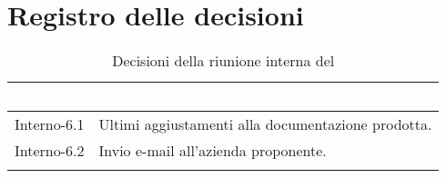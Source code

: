 \section{Registro delle decisioni}
{
\renewcommand{\arraystretch}{1.5}
\centering
\begin{longtable}{C{3cm} C{9cm}}
\textcolor{white}{\textbf{Codice}}&
\textcolor{white}{\textbf{Decisione}}\\	

\endhead
		
Interno-6.1 & Ultimi aggiustamenti alla documentazione prodotta.\\
Interno-6.2 & Invio e-mail all'azienda proponente.\\
\caption{Decisioni della riunione interna del \Data{}}
\end{longtable}
}
